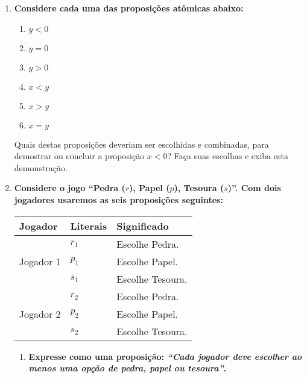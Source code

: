 \documentclass[a4paper,12pt]{article}
\begin{document}
\begin{enumerate}
\item {\bf Considere cada uma das proposições atômicas abaixo:}
\begin{enumerate}
\setlength{\itemsep}{-2pt} 
\item $y < 0$
\item $y = 0$
\item $y > 0$
\item $x < y$
\item $x > y$
\item $x = y$
\end{enumerate}
Quais destas proposições deveriam ser escolhidas e combinadas, para
demostrar ou concluir a proposição $x < 0$? Faça suas escolhas e exiba esta demonstração.



\item {\bf Considere o jogo ``Pedra ($r$), Papel ($p$), Tesoura ($s$)''.
  Com dois jogadores usaremos as seis proposições seguintes:}
  
\begin{table}[htb]
\begin{center}
\begin{tabular}{|l|l|l|}
\hline
Jogador 			    & Literais & Significado \\\hline
  \multirow{3}{*}{Jogador 1} & $r_1$ & Escolhe Pedra. \\
			     & $p_1$ & Escolhe Papel. \\
			     & $s_1$ & Escolhe Tesoura. \\\hline
  \multirow{3}{*}{Jogador 2} & $r_2$ & Escolhe Pedra. \\
			     & $p_2$ & Escolhe Papel. \\
			     & $s_2$ & Escolhe Tesoura.\\\hline
\end{tabular}
\end{center}
\end{table}

\begin{enumerate}
\item {\bf Expresse como uma proposição: \textit{``Cada jogador deve escolher ao menos uma opção de pedra, papel ou tesoura''}.}\\
 

\end{enumerate}
\end{enumerate}
\end{document}
